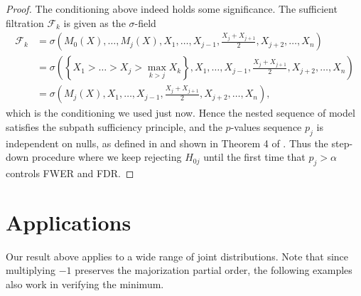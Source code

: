 \documentclass[11pt]{article}
\begin{document}
\begin{proof}
The conditioning above indeed holds some significance. The sufficient filtration \cite{Fithian:2015uj} $\mathcal{F}_k$ is given as the $\sigma$-field
\begin{align*}
\mathscr{F}_k & = \sigma\left(M_0\left(X\right), \ldots, M_j\left(X\right), X_1, \ldots, X_{j-1}, \frac{X_j + X_{j+1}}{2}, X_{j+2}, \ldots, X_n\right) \\
& = \sigma\left(\left\{X_1 > \ldots > X_j > \max_{k>j} X_k\right\}, X_1, \ldots, X_{j-1}, \frac{X_j + X_{j+1}}{2}, X_{j+2}, \ldots, X_n\right) \\
& = \sigma\left(M_j\left(X\right), X_1, \ldots, X_{j-1}, \frac{X_j + X_{j+1}}{2}, X_{j+2}, \ldots, X_n\right),
\end{align*}
which is the conditioning we used just now. Hence the nested sequence of model satisfies the subpath sufficiency principle, and the $p$-values sequence $p_j$ is independent on nulls, as defined in and shown in Theorem 4 of \cite{Fithian:2015uj}. Thus the step-down procedure where we keep rejecting $H_{0j}$ until the first time that $p_j > \alpha$ controls FWER and FDR.

\end{proof}

\section{Applications}
\label{sec:applications}

Our result above applies to a wide range of joint distributions. Note that since multiplying $-1$ preserves the majorization partial order, the following examples also work in verifying the minimum.
\end{document}
